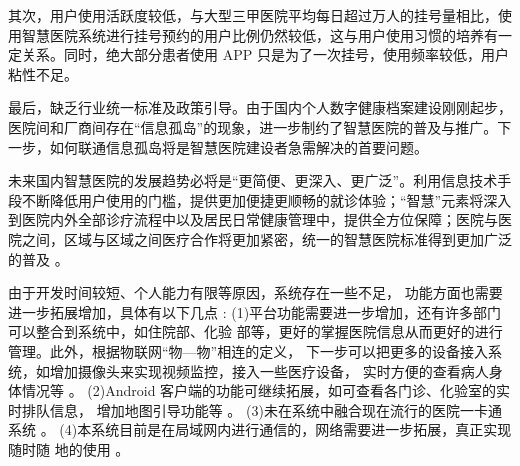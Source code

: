 \documentclass[doctor,secret]{thuthesis}
\begin{document}
其次，用户使用活跃度较低，与大型三甲医院平均每日超过万人的挂号量相比，使用智慧医院系统进行挂号预约的用户比例仍然较低，这与用户使用习惯的培养有一定关系。同时，绝大部分患者使用 APP 只是为了一次挂号，使用频率较低，用户粘性不足。

最后，缺乏行业统一标准及政策引导。由于国内个人数字健康档案建设刚刚起步，医院间和厂商间存在“信息孤岛”的现象，进一步制约了智慧医院的普及与推广。下一步，如何联通信息孤岛将是智慧医院建设者急需解决的首要问题。

未来国内智慧医院的发展趋势必将是“更简便、更深入、更广泛”。利用信息技术手段不断降低用户使用的门槛，提供更加便捷更顺畅的就诊体验；“智慧”元素将深入到医院内外全部诊疗流程中以及居民日常健康管理中，提供全方位保障；医院与医院之间，区域与区域之间医疗合作将更加紧密，统一的智慧医院标准得到更加广泛的普及 \cite{_nfc_2016}。

由于开发时间较短、个人能力有限等原因，系统存在一些不足， 功能方面也需要进一步拓展增加，具体有以下几点 \cite{2016c}:
(1)平台功能需要进一步增加，还有许多部门可以整合到系统中，如住院部、化验 部等，更好的掌握医院信息从而更好的进行管理。此外，根据物联网“物—物”相连的定义， 下一步可以把更多的设备接入系统，如增加摄像头来实现视频监控，接入一些医疗设备， 实时方便的查看病人身体情况等 \cite{RN85}。
(2)Android 客户端的功能可继续拓展，如可查看各门诊、化验室的实时排队信息， 增加地图引导功能等 \cite{RN140}。
(3)未在系统中融合现在流行的医院一卡通系统 \cite{__2013}。
(4)本系统目前是在局域网内进行通信的，网络需要进一步拓展，真正实现随时随 地的使用 \cite{adame_cuidats:_nodate}。

\cite{_emd_2016,__2016-1,__2014-2,__2014-1,__2013-3,__2013-2,__2012-1,__2012,_webpc_2015,__2014,__2013-1,__2013,__2015-8,__2015-7,__2015-6,_ble_2015,__2015-5,__2015-4,_android_2015,_ieee11073_2014,__2015-1}
\backmatter









\end{document}

